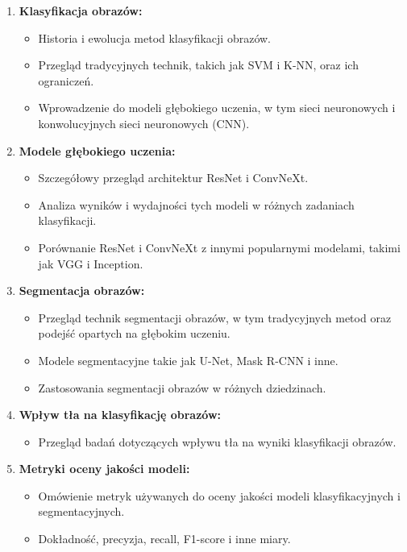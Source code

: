 \begin{enumerate}
    \item \textbf{Klasyfikacja obrazów:}
    \begin{itemize}
        \item Historia i ewolucja metod klasyfikacji obrazów.
        \item Przegląd tradycyjnych technik, takich jak SVM i K-NN, oraz ich ograniczeń.
        \item Wprowadzenie do modeli głębokiego uczenia, w tym sieci neuronowych i 
        konwolucyjnych sieci neuronowych (CNN).
    \end{itemize}
    \item \textbf{Modele głębokiego uczenia:}
    \begin{itemize}
        \item Szczegółowy przegląd architektur ResNet i ConvNeXt.
        \item Analiza wyników i wydajności tych modeli w różnych zadaniach klasyfikacji.
        \item Porównanie ResNet i ConvNeXt z innymi popularnymi modelami, takimi jak VGG i Inception.
    \end{itemize}
    \item \textbf{Segmentacja obrazów:}
    \begin{itemize}
        \item Przegląd technik segmentacji obrazów, w tym tradycyjnych metod oraz 
        podejść opartych na głębokim uczeniu.
        \item Modele segmentacyjne takie jak U-Net, Mask R-CNN i inne.
        \item Zastosowania segmentacji obrazów w różnych dziedzinach.
    \end{itemize}
    \item \textbf{Wpływ tła na klasyfikację obrazów:}
    \begin{itemize}
        \item Przegląd badań dotyczących wpływu tła na wyniki klasyfikacji obrazów.
    \end{itemize}
    \item \textbf{Metryki oceny jakości modeli:}
    \begin{itemize}
        \item Omówienie metryk używanych do oceny jakości modeli klasyfikacyjnych i segmentacyjnych.
        \item Dokładność, precyzja, recall, F1-score i inne miary.
    \end{itemize}
\end{enumerate}


